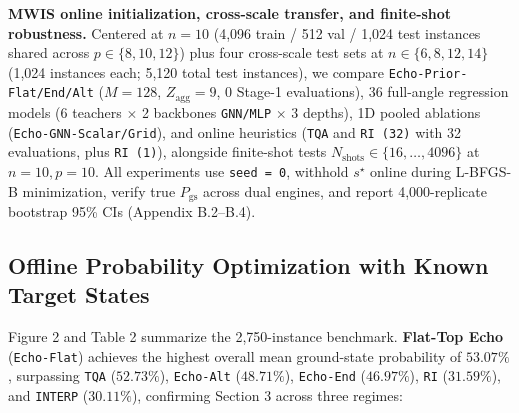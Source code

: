 \documentclass{article}
\theoremstyle{plain}
\theoremstyle{definition}
\begin{document}
\textbf{MWIS online initialization, cross-scale transfer, and finite-shot robustness.} Centered at $n=10$ (4,096 train / 512 val / 1,024 test instances shared across $p\in\{8,10,12\}$) plus four cross-scale test sets at $n\in\{6,8,12,14\}$ (1,024 instances each; 5,120 total test instances), we compare \texttt{Echo-Prior-Flat/\allowbreak{}End/\allowbreak{}Alt} ($M=128$, $Z_{\mathrm{agg}}=9$, $0$ Stage-1 evaluations), 36 full-angle regression models (6 teachers $\times$ 2 backbones \texttt{GNN/\allowbreak{}MLP} $\times$ 3 depths), 1D pooled ablations (\texttt{Echo-GNN-Scalar/\allowbreak{}Grid}), and online heuristics (\texttt{TQA} and \texttt{RI (32)} with 32 evaluations, plus \texttt{RI (1)}), alongside finite-shot tests $N_{\mathrm{shots}}\in\{16,\ldots,4096\}$ at $n=10, p=10$. All experiments use \texttt{seed = 0}, withhold $s^\star$ online during L-BFGS-B minimization, verify true $P_{\mathrm{gs}}$ across dual engines, and report 4,000-replicate bootstrap 95\% CIs (Appendix B.2--B.4).

\subsection{Offline Probability Optimization with Known Target States}\label{subsec:5_2}




Figure 2 and Table 2 summarize the 2,750-instance benchmark. \textbf{Flat-Top Echo} (\texttt{Echo-Flat}) achieves the highest overall mean ground-state probability of $\mathbf{53.07}\%$, surpassing \texttt{TQA} ($52.73\%$), \texttt{Echo-Alt} ($48.71\%$), \texttt{Echo-End} ($46.97\%$), \texttt{RI} ($31.59\%$), and \texttt{INTERP} ($30.11\%$), confirming Section 3 across three regimes:
\end{document}
